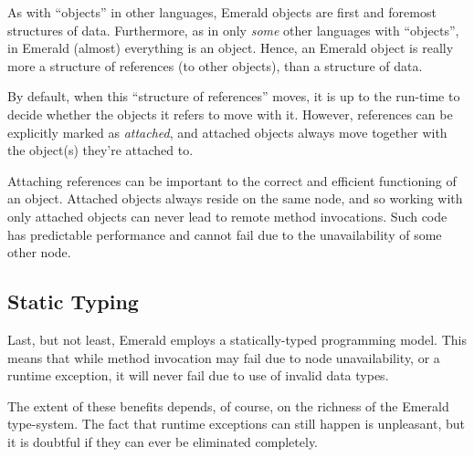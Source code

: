 As with ``objects'' in other languages, Emerald objects are first and
foremost structures of data.  Furthermore, as in only \emph{some}
other languages with ``objects'', in Emerald (almost) everything is an
object. Hence, an Emerald object is really more a structure of
references (to other objects), than a structure of data.

By default, when this ``structure of references'' moves, it is up to
the run-time to decide whether the objects it refers to move with it.
However, references can be explicitly marked as \emph{attached}, and
attached objects always move together with the object(s) they're
attached to.

Attaching references can be important to the correct and efficient
functioning of an object. Attached objects always reside on the same
node, and so working with only attached objects can never lead to
remote method invocations. Such code has predictable performance and
cannot fail due to the unavailability of some other node.

\subsection*{Static Typing}

Last, but not least, Emerald employs a statically-typed programming
model. This means that while method invocation may fail due to node
unavailability, or a runtime exception, it will never fail due to
use of invalid data types.

The extent of these benefits depends, of course, on the richness of
the Emerald type-system. The fact that runtime exceptions can still
happen is unpleasant, but it is doubtful if they can ever be
eliminated completely.


